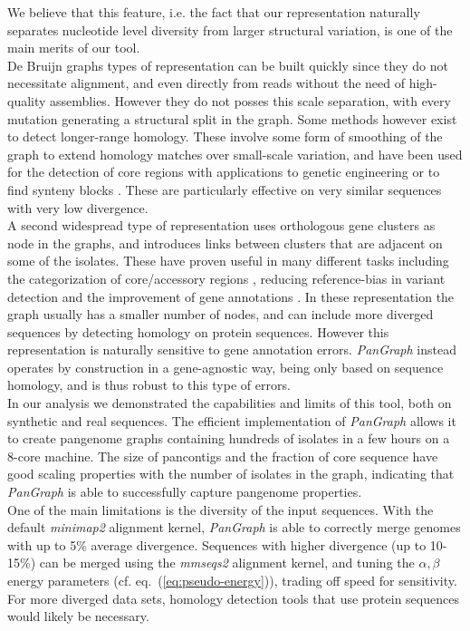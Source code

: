 \documentclass[aps,rmp,preprint,superscriptaddress,10pt,linenumbers]{revtex4-1}
\begin{document}
We believe that this feature, i.e. the fact that our representation naturally separates nucleotide level diversity from larger structural variation, is one of the main merits of our tool.\\
De Bruijn graphs types of representation can be built quickly since they do not necessitate alignment, and even directly from reads without the need of high-quality assemblies. However they do not posses this scale separation, with every mutation generating a structural split in the graph. Some methods however exist to detect longer-range homology. These involve some form of smoothing of the graph to extend homology matches over small-scale variation, and have been used for the detection of core regions with applications to genetic engineering \cite{schulz2022sequence} or to find synteny blocks \cite{minkin2013sibelia}. These are particularly effective on very similar sequences with very low divergence.\\
A second widespread type of representation uses orthologous gene clusters as node in the graphs, and introduces links between clusters that are adjacent on some of the isolates. These have proven useful in many different tasks including the categorization of core/accessory regions \cite{gautreau2020ppanggolin,sutton2021pan}, reducing reference-bias in variant detection \cite{colquhoun2021pandora} and the improvement of gene annotations \cite{tonkin2020producing}. In these representation the graph usually has a smaller number of nodes, and can include more diverged sequences by detecting homology on protein sequences. However this representation is naturally sensitive to gene annotation errors. 
\textit{PanGraph} instead operates by construction in a gene-agnostic way, being only based on sequence homology, and is thus robust to this type of errors.\\

In our analysis we demonstrated the capabilities and limits of this tool, both on synthetic and real sequences. The efficient implementation of \textit{PanGraph} allows it to create pangenome graphs containing hundreds of isolates in a few hours on a 8-core machine. The size of pancontigs and the fraction of core sequence have good scaling properties with the number of isolates in the graph, indicating that \textit{PanGraph} is able to successfully capture pangenome properties.\\
One of the main limitations is the diversity of the input sequences. With the default \textit{minimap2} alignment kernel, \textit{PanGraph} is able to correctly merge genomes with up to 5\% average divergence. Sequences with higher divergence (up to 10-15\%) can be merged using the \textit{mmseqs2} alignment kernel, and tuning the $\alpha, \beta$ energy parameters (cf. eq.~(\ref{eq:pseudo-energy})), trading off speed for sensitivity.
For more diverged data sets, homology detection tools that use protein sequences would likely be necessary.
\end{document}
